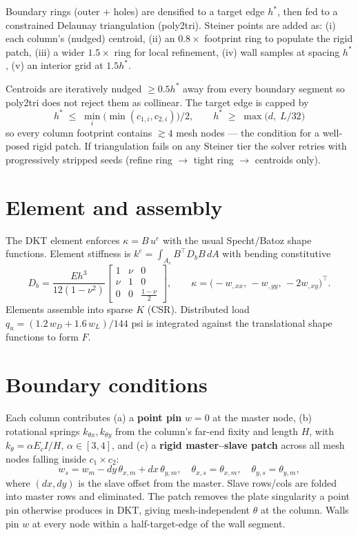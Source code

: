 \documentclass[10pt]{article}
\begin{document}
Boundary rings (outer $+$ holes) are densified to a target edge $h^{\!*}$, then fed to a constrained Delaunay triangulation (poly2tri). Steiner points are added as: (i) each column's (nudged) centroid, (ii) an $0.8\!\times$ footprint ring to populate the rigid patch, (iii) a wider $1.5\!\times$ ring for local refinement, (iv) wall samples at spacing $h^{\!*}$, (v) an interior grid at $1.5h^{\!*}$.

Centroids are iteratively nudged $\ge 0.5h^{\!*}$ away from every boundary segment so poly2tri does not reject them as collinear. The target edge is capped by
\[
h^{\!*}\;\le\;\min_{i}\bigl(\min(c_{1,i},c_{2,i})\bigr)\big/ 2,
\qquad
h^{\!*}\;\ge\;\max\!\bigl(d,\;L/32\bigr)
\]
so every column footprint contains $\gtrsim 4$ mesh nodes --- the condition for a well-posed rigid patch. If triangulation fails on any Steiner tier the solver retries with progressively stripped seeds (refine ring $\to$ tight ring $\to$ centroids only).

\section*{Element and assembly}
The DKT element enforces $\kappa = B\,u^e$ with the usual Specht/Batoz shape functions. Element stiffness is $k^e = \int_{A_e} B^{\!\top} D_b B\,dA$ with bending constitutive
\[
D_b = \frac{E h^3}{12(1-\nu^2)}\begin{bmatrix}1 & \nu & 0 \\ \nu & 1 & 0 \\ 0 & 0 & \tfrac{1-\nu}{2}\end{bmatrix},
\qquad
\kappa = \bigl(-w_{,xx},\,-w_{,yy},\,-2w_{,xy}\bigr)^{\!\top}.
\]
Elements assemble into sparse $K$ (CSR). Distributed load $q_u = (1.2\,w_D + 1.6\,w_L)/144$ psi is integrated against the translational shape functions to form $F$.

\section*{Boundary conditions}
Each column contributes (a) a \textbf{point pin} $w = 0$ at the master node, (b) rotational springs $k_{\theta x}, k_{\theta y}$ from the column's far-end fixity and length $H$, with $k_\theta = \alpha E_c I / H$, $\alpha\in[3,4]$, and (c) a \textbf{rigid master--slave patch} across all mesh nodes falling inside $c_1\!\times\! c_2$:
\[
w_s = w_m - dy\,\theta_{x,m} + dx\,\theta_{y,m},\quad
\theta_{x,s}=\theta_{x,m},\quad \theta_{y,s}=\theta_{y,m},
\]
where $(dx,dy)$ is the slave offset from the master. Slave rows/cols are folded into master rows and eliminated. The patch removes the plate singularity a point pin otherwise produces in DKT, giving mesh-independent $\theta$ at the column. Walls pin $w$ at every node within a half-target-edge of the wall segment.
\end{document}
